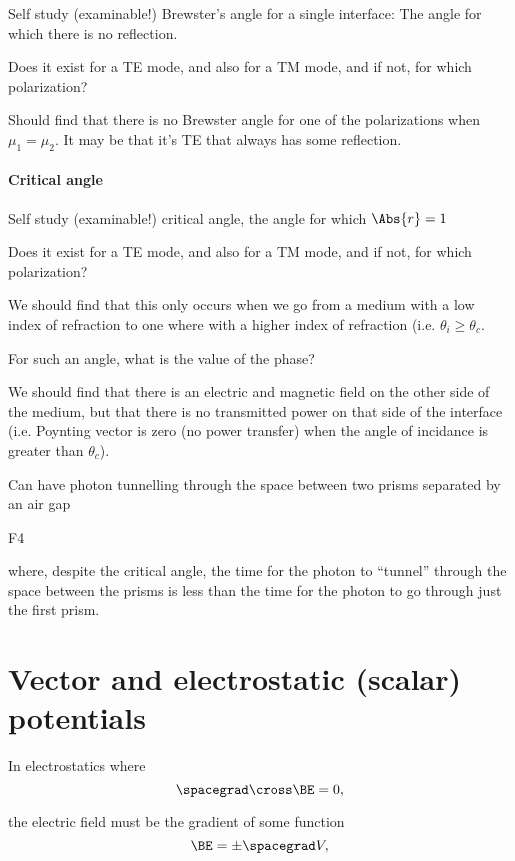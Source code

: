 Self study (examinable!) Brewster's angle for a single interface: The angle for which there is no reflection.

Does it exist for a TE mode, and also for a TM mode, and if not, for which polarization?

Should find that there is no Brewster angle for one of the polarizations when \( \mu_1 = \mu_2 \).  It may be that it's TE that always has some reflection.

\paragraph{Critical angle}

Self study (examinable!) critical angle, the angle for which \( \Abs{r} = 1 \)

Does it exist for a TE mode, and also for a TM mode, and if not, for which polarization?

We should find that this only occurs when we go from a medium with a low index of refraction to one where with a higher index of refraction (i.e. \( \theta_i \ge \theta_c \).

For such an angle, what is the value of the phase?

We should find that there is an electric and magnetic field on the other side of the medium, but that there is no transmitted power on that side of the interface (i.e. Poynting vector is zero (no power transfer) when the angle of incidance is greater than \( \theta_c \)).

Can have photon tunnelling through the space between two prisms separated by an air gap

F4

where, despite the critical angle, the time for the photon to ``tunnel'' through the space between the prisms is less than the time for the photon to go through just the first prism.

\section{Vector and electrostatic (scalar) potentials}

In electrostatics where
\begin{dmath}\label{eqn:emtLecture10:720}
\spacegrad \cross \BE  = 0,
\end{dmath}

the electric field must be the gradient of some function
\begin{dmath}\label{eqn:emtLecture10:740}
\BE = \pm \spacegrad V,
\end{dmath}

